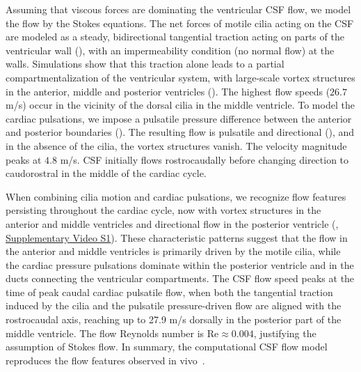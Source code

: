 \documentclass{WileyMSP-template}
\begin{document}
Assuming that viscous forces are dominating the ventricular CSF flow,
we model the flow by the Stokes equations.
The net forces of motile cilia acting on the CSF are modeled as a steady,
bidirectional tangential traction acting on parts of the ventricular wall
(), with an impermeability condition (no normal flow) at the walls.
Simulations show that this traction alone
leads to a partial compartmentalization of the ventricular system,
with large-scale vortex structures in the anterior, middle and
posterior ventricles (). The highest flow
speeds ($26.7$ \textmu m/s) occur in the vicinity of the dorsal cilia
in the middle ventricle. To model the cardiac pulsations, we impose a
pulsatile pressure difference between the anterior and posterior
boundaries (). The resulting flow
is pulsatile and directional (), and
in the absence of the cilia, the vortex structures vanish. The
velocity magnitude peaks at $4.8$ \textmu m/s. CSF initially flows
rostrocaudally before changing direction to caudorostral in the middle
of the cardiac cycle.

When combining cilia motion and cardiac pulsations, we recognize flow features
persisting throughout the cardiac cycle, now with vortex structures in
the anterior and middle ventricles and directional flow in the
posterior ventricle (,
\href{https://doi.org/10.5281/zenodo.15194757}{Supplementary Video S1}).
These characteristic patterns suggest that the flow in
the anterior and middle ventricles is primarily driven by the motile
cilia, while the cardiac pressure pulsations dominate within the
posterior ventricle and in the ducts connecting the ventricular
compartments. The CSF flow speed peaks at the time of peak caudal
cardiac pulsatile flow, when both the tangential traction induced by
the cilia and the pulsatile pressure-driven flow are aligned with the
rostrocaudal axis, reaching up to 27.9 \textmu m/s dorsally in the
posterior part of the middle ventricle. The flow Reynolds number is
$\mathrm{Re} \approx 0.004$, justifying the assumption of Stokes
flow. In summary, the computational CSF flow model reproduces the flow
features observed in vivo~\cite{Olstad2019CiliaryDevelopment}.
\end{document}
